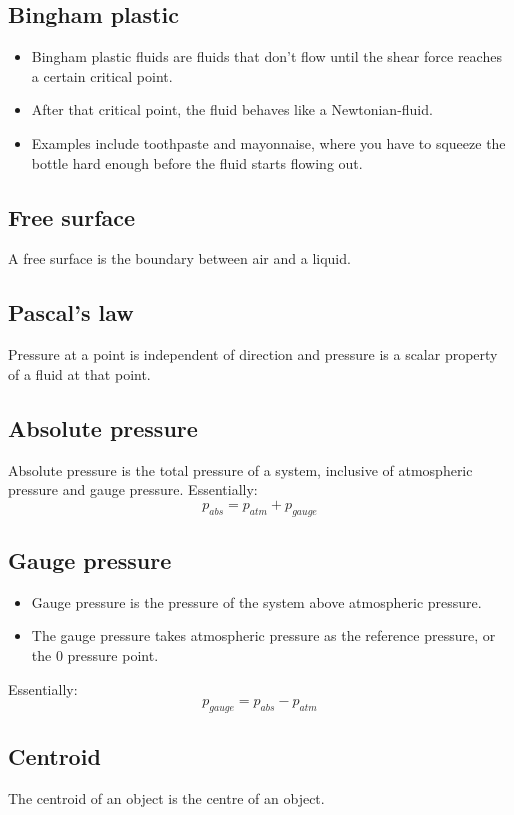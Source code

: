 \documentclass[11pt]{article}
\begin{document}
\subsection{Bingham plastic}
\label{sec:orgf8066f3}
\begin{itemize}
\item Bingham plastic fluids are fluids that don't flow until the shear force reaches a certain critical point.
\item After that critical point, the fluid behaves like a Newtonian-fluid.
\item Examples include toothpaste and mayonnaise, where you have to squeeze the bottle hard enough before the fluid starts flowing out.
\end{itemize}

\subsection{Free surface}
\label{sec:orgfda12db}
A free surface is the boundary between air and a liquid.

\subsection{Pascal's law}
\label{sec:org26c7704}
Pressure at a point is independent of direction and pressure is a scalar property of a fluid at that point.

\subsection{Absolute pressure}
\label{sec:org3427874}
Absolute pressure is the total pressure of a system, inclusive of atmospheric pressure and gauge pressure. Essentially:
\[p_{abs} = p_{atm} + p_{gauge}\]

\subsection{Gauge pressure}
\label{sec:org86e0972}
\begin{itemize}
\item Gauge pressure is the pressure of the system above atmospheric pressure.
\item The gauge pressure takes atmospheric pressure as the reference pressure, or the 0 pressure point.
\end{itemize}

Essentially:
\[p_{gauge} = p_{abs} - p_{atm}\]

\subsection{Centroid}
\label{sec:org2e5254f}
The centroid of an object is the centre of an object.
\end{document}
